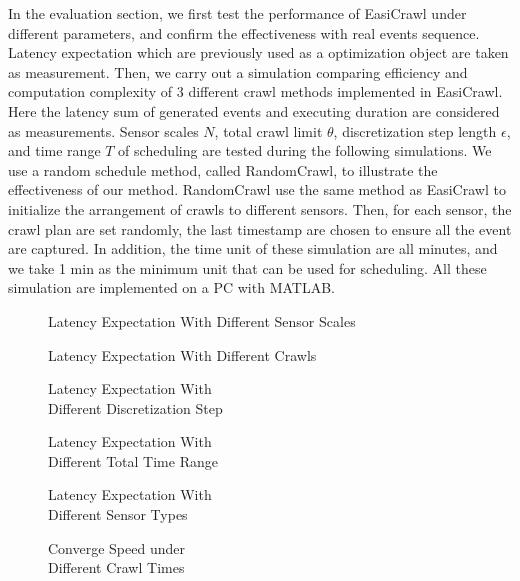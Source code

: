\documentclass[conference]{IEEEtran}
\begin{document}
In the evaluation section, we first test the performance of EasiCrawl under different parameters, and confirm the effectiveness with real events sequence. Latency expectation which are previously used as a optimization object are taken as measurement.
Then, we carry out a simulation comparing efficiency and computation complexity of 3 different crawl methods implemented in EasiCrawl. Here the latency sum of generated events and executing duration are considered as measurements.
Sensor scales $N$, total crawl limit $\theta$, discretization step length $\epsilon$, and time range $T$ of scheduling are tested during the following simulations. We use a random schedule method, called RandomCrawl, to illustrate the effectiveness of our method. RandomCrawl use the same method as EasiCrawl to initialize the arrangement of crawls to different sensors. Then, for each sensor, the crawl plan are set randomly, the last timestamp are chosen to ensure all the event are captured. In addition, the time unit of these simulation are all minutes, and we take 1 min as the minimum unit that can be used for scheduling.
All these simulation are implemented on a PC with MATLAB.
\begin{figure*}
		
		\captionsetup{justification=centering}
		\caption{Latency Expectation With Different Sensor Scales}
		\label{fig:test1_sensorscale}
	\endminipage\hfill
		
		\captionsetup{justification=centering}
		\caption{Latency Expectation With Different Crawls}
		\label{fig:test2_totalcrawl}
	\endminipage\hfill
		
		\captionsetup{justification=centering}
		\caption{Latency Expectation With \\Different Discretization Step}
		\label{fig:test3_discretestep}
	\endminipage
	
		
		\captionsetup{justification=centering}
		\caption{Latency Expectation With \\Different Total Time Range}
		\label{fig:test4_timerange}
	\endminipage\hfill
		
		\captionsetup{justification=centering}
		\caption{Latency Expectation With \\Different Sensor Types}
		\label{fig:test5_sensortype}
	\endminipage\hfill
		
		\captionsetup{justification=centering}
		\caption{Converge Speed under \\Different Crawl Times}
		\label{fig:test6_convergespeed}
	\endminipage	
\end{figure*}
\end{document}
